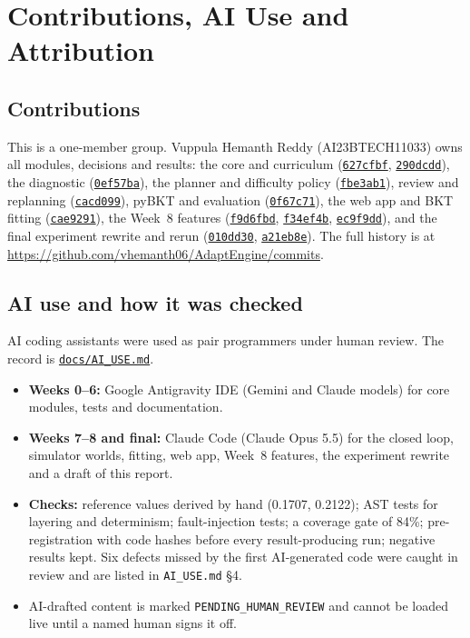 \documentclass[11pt,a4paper]{article}
\newcommand{\finaltag}{cs5903-final-2026}
\newcommand{\repobase}{https://github.com/vhemanth06/AdaptEngine}
\newcommand{\repo}[1]{\href{\repobase/blob/\finaltag/#1}{\nolinkurl{#1}}}
\newcommand{\commit}[1]{\href{\repobase/commit/#1}{\texttt{#1}}}
\begin{document}
\section{Contributions, AI Use and Attribution}

\subsection{Contributions}

This is a one-member group. Vuppula Hemanth Reddy (AI23BTECH11033) owns all modules, decisions and results: the core and curriculum (\commit{627cfbf}, \commit{290dcdd}), the diagnostic (\commit{0ef57ba}), the planner and difficulty policy (\commit{fbe3ab1}), review and replanning (\commit{cacd099}), pyBKT and evaluation (\commit{0f67c71}), the web app and BKT fitting (\commit{cae9291}), the Week~8 features (\commit{f9d6fbd}, \commit{f34ef4b}, \commit{ec9f9dd}), and the final experiment rewrite and rerun (\commit{010dd30}, \commit{a21eb8e}). The full history is at \url{https://github.com/vhemanth06/AdaptEngine/commits}.

\subsection{AI use and how it was checked}

AI coding assistants were used as pair programmers under human review. The record is \repo{docs/AI_USE.md}.
\begin{itemize}
\item \textbf{Weeks 0--6:} Google Antigravity IDE (Gemini and Claude models) for core modules, tests and documentation.
\item \textbf{Weeks 7--8 and final:} Claude Code (Claude Opus 5.5) for the closed loop, simulator worlds, fitting, web app, Week~8 features, the experiment rewrite and a draft of this report.
\item \textbf{Checks:} reference values derived by hand (0.1707, 0.2122); AST tests for layering and determinism; fault-injection tests; a coverage gate of 84\%; pre-registration with code hashes before every result-producing run; negative results kept. Six defects missed by the first AI-generated code were caught in review and are listed in \texttt{AI\_USE.md} \S4.
\item AI-drafted content is marked \texttt{PENDING\_HUMAN\_REVIEW} and cannot be loaded live until a named human signs it off.
\end{itemize}
\end{document}
